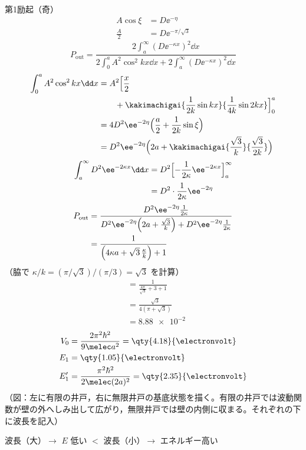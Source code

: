第1励起（奇）
\begin{align*}
A\cos\xi&=D\ee^{-\eta}\\
\frac{A}{2}&=D\ee^{-\pi/\sqrt{3}}
\end{align*}
\[ P_{\mathrm{out}}=\frac{2\int_{a}^{\infty}(D\ee^{-\kappa x})^{2}\dd x}{2\int_{0}^{a}A^{2}\cos^{2}kx\dd x+2\int_{a}^{\infty}(D\ee^{-\kappa x})^{2}\dd x} \]
\begin{align*}
\int_{0}^{a}A^{2}\cos^{2}kx\dd x&=A^{2}\Bigl[\frac{x}{2}\\
&\qquad+\kakimachigai{\frac{1}{2k}\sin kx}{\frac{1}{4k}\sin 2kx}\Bigr]_{0}^{a}\\
&=4D^{2}\ee^{-2\eta}\Bigl(\frac{a}{2}+\frac{1}{2k}\sin\xi\Bigr)\\
&=D^{2}\ee^{-2\eta}\Bigl(2a+\kakimachigai{\frac{\sqrt{3}}{k}}{\frac{\sqrt{3}}{2k}}\Bigr)
\end{align*}
\begin{align*}
\int_{a}^{\infty}D^{2}\ee^{-2\kappa x}\dd x&=D^{2}\Bigl[-\frac{1}{2\kappa}\ee^{-2\kappa x}\Bigr]_{a}^{\infty}\\
&=D^{2}\cdot\frac{1}{2\kappa}\ee^{-2\eta}
\end{align*}
\begin{align*}
P_{\mathrm{out}}&=\frac{D^{2}\ee^{-2\eta}\frac{1}{2\kappa}}{D^{2}\ee^{-2\eta}\Bigl(2a+\frac{\sqrt{3}}{k}\Bigr)+D^{2}\ee^{-2\eta}\frac{1}{2\kappa}}\\
&=\frac{1}{\Bigl(4\kappa a+\sqrt{3}\,\frac{\kappa}{k}\Bigr)+1}
\end{align*}
（脇で $\kappa/k=(\pi/\sqrt{3})/(\pi/3)=\sqrt{3}$ を計算）
\begin{align*}
&=\frac{1}{\frac{4\pi}{\sqrt{3}}+3+1}\\
&=\frac{\sqrt{3}}{4(\pi+\sqrt{3})}\\
&=\num{8.88e-2}
\end{align*}
\begin{align*}
V_{0}&=\frac{2\pi^{2}\hbar^{2}}{9\melec a^{2}}=\qty{4.18}{\electronvolt}\\
E_{1}&=\qty{1.05}{\electronvolt}\\
E_{1}'&=\frac{\pi^{2}\hbar^{2}}{2\melec(2a)^{2}}=\qty{2.35}{\electronvolt}
\end{align*}
（図：左に有限の井戸，右に無限井戸の基底状態を描く。有限の井戸では波動関数が壁の外へしみ出して広がり，無限井戸では壁の内側に収まる。それぞれの下に波長を記入）

波長（大）$\to$ $E$ 低い $<$ 波長（小）$\to$ エネルギー高い
